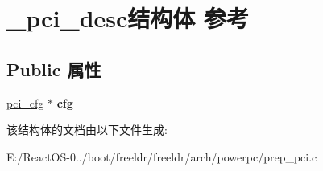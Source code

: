 \hypertarget{struct__pci__desc}{}\section{\+\_\+pci\+\_\+desc结构体 参考}
\label{struct__pci__desc}
\subsection*{Public 属性}
\begin{DoxyCompactItemize}
\item 
\mbox{\label{struct__pci__desc_ad6c6200778af0c12d14c030c28e8b364}} 
\hyperlink{struct__pci__cfg}{pci\+\_\+cfg} $\ast$ {\bfseries cfg}
\end{DoxyCompactItemize}


该结构体的文档由以下文件生成\+:\begin{DoxyCompactItemize}
\item 
E\+:/\+React\+O\+S-\/0../boot/freeldr/freeldr/arch/powerpc/prep\+\_\+pci.\+c\end{DoxyCompactItemize}
